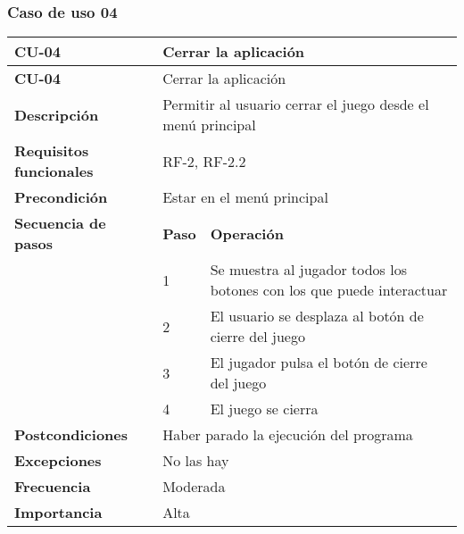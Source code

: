 \subsubsection{Caso de uso 04}
\begin{longtable}{lll}
\textbf{CU-04}                                   & \multicolumn{2}{l}{Cerrar la aplicación}                                              \\ \hline
\endfirsthead
\textbf{CU-04}                                   & \multicolumn{2}{l}{Cerrar la aplicación}                                              \\ \hline
\endhead
%
\textbf{Descripción}                             & \multicolumn{2}{l}{Permitir al usuario cerrar el juego desde el menú principal}       \\ \hline
\textbf{Requisitos funcionales}                  & \multicolumn{2}{l}{RF-2, RF-2.2}                                                      \\ \hline
\textbf{Precondición}                            & \multicolumn{2}{l}{Estar en el menú principal}                                        \\ \hline
\multicolumn{1}{l|}{\textbf{Secuencia de pasos}} & \textbf{Paso} & \textbf{Operación}                                                    \\ \cline{2-3} 
\multicolumn{1}{l|}{}                            & 1             & Se muestra al jugador todos los botones con los que puede interactuar \\
\multicolumn{1}{l|}{}                            & 2             & El usuario se desplaza al botón de cierre del juego                   \\
\multicolumn{1}{l|}{}                            & 3             & El jugador pulsa el botón de cierre del juego                         \\
\multicolumn{1}{l|}{}                            & 4             & El juego se cierra                                                    \\ \hline
\textbf{Postcondiciones}                         & \multicolumn{2}{l}{Haber parado la ejecución del programa}                            \\ \hline
\textbf{Excepciones}                             & \multicolumn{2}{l}{No las hay}                                                        \\ \hline
\textbf{Frecuencia}                              & \multicolumn{2}{l}{Moderada}                                                          \\ \hline
\textbf{Importancia}                             & \multicolumn{2}{l}{Alta}                                                              \\ \hline
\end{longtable}

